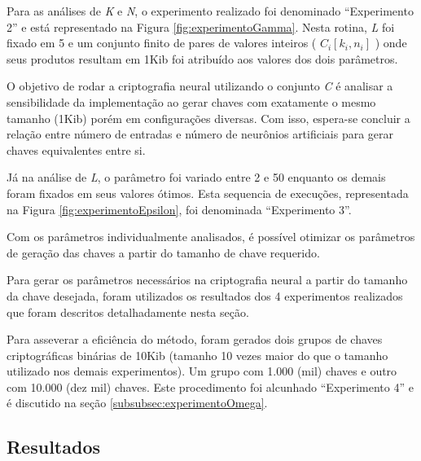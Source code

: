 \documentclass[12pt]{article}
\begin{document}
            Para as análises de \textit{K} e \textit{N}, o experimento realizado foi denominado ``Experimento 2'' e está representado na Figura \ref{fig:experimentoGamma}. Nesta rotina, \textit{L} foi fixado em 5 e um conjunto finito de pares de valores inteiros ( $C_i [k_i, n_i]$ ) onde seus produtos resultam em 1Kib foi atribuído aos valores dos dois parâmetros.

            

            O objetivo de rodar a criptografia neural utilizando o conjunto \textit{C} é analisar a sensibilidade da implementação ao gerar chaves com exatamente o mesmo tamanho (1Kib) porém em configurações diversas. Com isso, espera-se concluir a relação entre número de entradas e número de neurônios artificiais para gerar chaves equivalentes entre si.
            
            Já na análise de \textit{L}, o parâmetro foi variado entre 2 e 50 enquanto os demais foram fixados em seus valores ótimos. Esta sequencia de execuções, representada na Figura \ref{fig:experimentoEpsilon}, foi denominada ``Experimento 3''.
            
            

            Com os parâmetros individualmente analisados, é possível otimizar os parâmetros de geração das chaves a partir do tamanho de chave requerido.

            Para gerar os parâmetros necessários na criptografia neural a partir do tamanho da chave desejada, foram utilizados os resultados dos 4 experimentos realizados que foram descritos detalhadamente nesta seção.
            
            Para asseverar a eficiência do método, foram gerados dois grupos de chaves criptográficas binárias de 10Kib (tamanho 10 vezes maior do que o tamanho utilizado nos demais experimentos). Um grupo com 1.000 (mil) chaves e outro com 10.000 (dez mil) chaves. Este procedimento foi alcunhado ``Experimento 4'' e é discutido na seção \ref{subsubsec:experimentoOmega}.

        \subsection{Resultados}
        \label{subsec:resultados}
\end{document}
